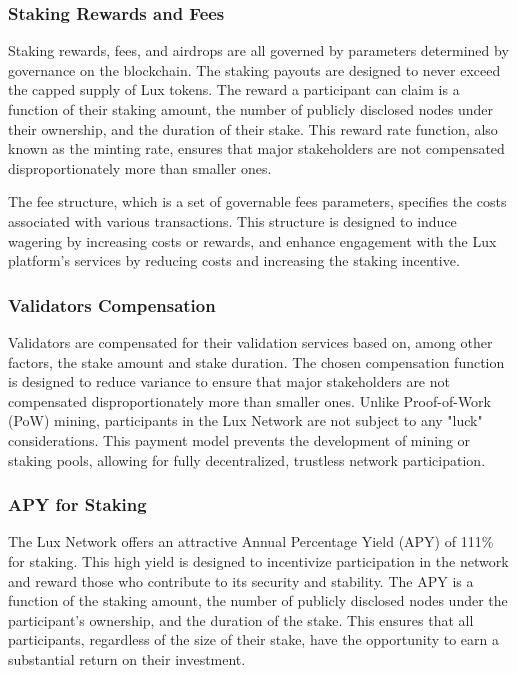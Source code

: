 \documentclass[11pt]{article}
\begin{document}
\subsubsection{Staking Rewards and Fees}

Staking rewards, fees, and airdrops are all governed by parameters determined by governance on the blockchain. The staking payouts are designed to never exceed the capped supply of Lux tokens. The reward a participant can claim is a function of their staking amount, the number of publicly disclosed nodes under their ownership, and the duration of their stake. This reward rate function, also known as the minting rate, ensures that major stakeholders are not compensated disproportionately more than smaller ones.


The fee structure, which is a set of governable fees parameters, specifies the costs associated with various transactions. This structure is designed to induce wagering by increasing costs or rewards, and enhance engagement with the Lux platform's services by reducing costs and increasing the staking incentive.


\subsubsection{Validators Compensation}

Validators are compensated for their validation services based on, among other factors, the stake amount and stake duration. The chosen compensation function is designed to reduce variance to ensure that major stakeholders are not compensated disproportionately more than smaller ones. Unlike Proof-of-Work (PoW) mining, participants in the Lux Network are not subject to any "luck" considerations. This payment model prevents the development of mining or staking pools, allowing for fully decentralized, trustless network participation.


\subsubsection{APY for Staking}

The Lux Network offers an attractive Annual Percentage Yield (APY) of 111\% for staking. This high yield is designed to incentivize participation in the network and reward those who contribute to its security and stability. The APY is a function of the staking amount, the number of publicly disclosed nodes under the participant's ownership, and the duration of the stake. This ensures that all participants, regardless of the size of their stake, have the opportunity to earn a substantial return on their investment.
\end{document}
